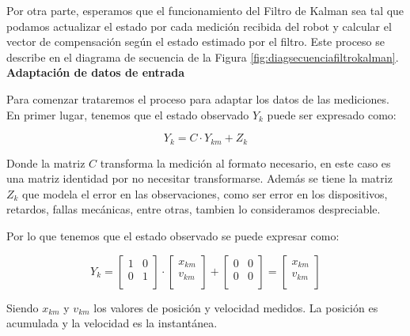 Por otra parte, esperamos que el funcionamiento del Filtro de Kalman sea tal que podamos actualizar el estado por cada medición recibida del robot y calcular el vector de compensación según el estado estimado por el filtro. Este proceso se describe en el diagrama de secuencia de la Figura \ref{fig:diagsecuenciafiltrokalman}. \\


\textbf{Adaptación de datos de entrada} \mbox{} \vspace{8pt}

Para comenzar trataremos el proceso para adaptar los datos de las mediciones. En primer lugar, tenemos que el estado observado $Y_k$ puede ser expresado como:

$$ Y_k = C \cdot Y_{km} + Z_k $$

Donde la matriz $C$ transforma la medición al formato necesario, en este caso es una matriz identidad por no necesitar transformarse. Además se tiene la matriz $Z_k$ que modela el error en las observaciones, como ser error en los dispositivos, retardos, fallas mecánicas, entre otras, tambien lo consideramos despreciable.

Por lo que tenemos que el estado observado se puede expresar como:

$$ Y_k =
    \begin{bmatrix}
    1 & 0 \\
    0 & 1  \\
    \end{bmatrix}
    \cdot
    \begin{bmatrix} x_{km} \\ v_{km} \\ \end{bmatrix}
    +
    \begin{bmatrix}
    0 & 0  \\
    0 & 0  \\
    \end{bmatrix}
    =
    \begin{bmatrix} x_{km} \\ v_{km} \\ \end{bmatrix}
$$

Siendo $x_{km}$ y $v_{km}$ los valores de posición y velocidad medidos. La posición es acumulada y la velocidad es la instantánea. \\

